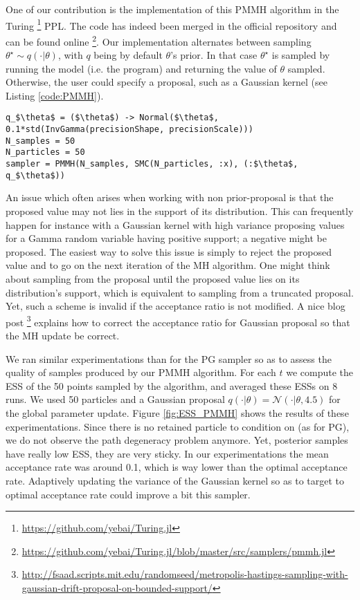 One of our contribution is the implementation of this \gls{PMMH} algorithm in the Turing \footnote{\url{https://github.com/yebai/Turing.jl}} \acrlong{PPL}.
The code has indeed been merged in the official repository and can be found online \footnote{\url{https://github.com/yebai/Turing.jl/blob/master/src/samplers/pmmh.jl}}.
Our implementation alternates between sampling $\theta^\star \sim q(\cdot | \theta)$, with $q$ being by default $\theta$'s prior. In that case $\theta^\star$ is sampled by running the model (i.e. the program) and returning the value of $\theta$ sampled. Otherwise, the user could specify a proposal, such as a Gaussian kernel (see Listing \ref{code:PMMH}).

\begin{lstlisting}[caption={PMMH sampler constructor written in Turing.jl.},captionpos=b,label=code:PMMH]
q_$\theta$ = ($\theta$) -> Normal($\theta$, 0.1*std(InvGamma(precisionShape, precisionScale)))
N_samples = 50
N_particles = 50
sampler = PMMH(N_samples, SMC(N_particles, :x), (:$\theta$, q_$\theta$))
\end{lstlisting}

An issue which often arises when working with non prior-proposal is that the proposed value may not lies in the support of its distribution. This can frequently happen for instance with a Gaussian kernel with high variance proposing values for a Gamma random variable having positive support; a negative might be proposed.
The easiest way to solve this issue is simply to reject the proposed value and to go on the next iteration of the \gls{MH} algorithm.
One might think about sampling from the proposal until the proposed value lies on its distribution's support, which is equivalent to sampling from a truncated proposal. Yet, such a scheme is invalid if the acceptance ratio is not modified. A nice blog post \footnote{\url{http://fsaad.scripts.mit.edu/randomseed/metropolis-hastings-sampling-with-gaussian-drift-proposal-on-bounded-support/}} explains how to correct the acceptance ratio for Gaussian proposal so that the \gls{MH} update be correct.

We ran similar experimentations than for the \gls{PG} sampler so as to assess the quality of samples produced by our \gls{PMMH} algorithm. For each $t$ we compute the \gls{ESS} of the 50 points sampled by the algorithm, and averaged these \gls{ESS}s on 8 runs. We used 50 particles and a Gaussian proposal $q(\cdot| \theta) = \mathcal{N}(\cdot|\theta,4.5)$ for the global parameter update. Figure \ref{fig:ESS_PMMH} shows the results of these experimentations. Since there is no retained particle to condition on (as for \gls{PG}), we do not observe the path degeneracy problem anymore. Yet, posterior samples have really low \gls{ESS}, they are very sticky. In our experimentations the mean acceptance rate was around 0.1, which is way lower than the optimal acceptance rate. Adaptively updating the variance of the Gaussian kernel so as to target to optimal acceptance rate could improve a bit this sampler.

